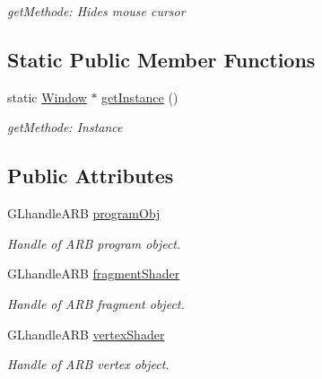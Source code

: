 \begin{DoxyCompactItemize}
\begin{DoxyCompactList}\small\item\em getMethode: Hides mouse cursor \item\end{DoxyCompactList}\end{DoxyCompactItemize}
\subsection*{Static Public Member Functions}
\begin{DoxyCompactItemize}
\item 
\hypertarget{class_f2_c_1_1_window_adc900b123525bb6a454ef0d44b5d65d4}{
static \hyperlink{class_f2_c_1_1_window}{Window} $\ast$ \hyperlink{class_f2_c_1_1_window_adc900b123525bb6a454ef0d44b5d65d4}{getInstance} ()}
\label{class_f2_c_1_1_window_adc900b123525bb6a454ef0d44b5d65d4}

\begin{DoxyCompactList}\small\item\em getMethode: Instance \item\end{DoxyCompactList}\end{DoxyCompactItemize}
\subsection*{Public Attributes}
\begin{DoxyCompactItemize}
\item 
\hypertarget{class_f2_c_1_1_window_a42eeb484184d4baf3bc7fe3c74ecb493}{
GLhandleARB \hyperlink{class_f2_c_1_1_window_a42eeb484184d4baf3bc7fe3c74ecb493}{programObj}}
\label{class_f2_c_1_1_window_a42eeb484184d4baf3bc7fe3c74ecb493}

\begin{DoxyCompactList}\small\item\em Handle of ARB program object. \item\end{DoxyCompactList}\item 
\hypertarget{class_f2_c_1_1_window_af149e31ade5f6fc7385413a83b2176d9}{
GLhandleARB \hyperlink{class_f2_c_1_1_window_af149e31ade5f6fc7385413a83b2176d9}{fragmentShader}}
\label{class_f2_c_1_1_window_af149e31ade5f6fc7385413a83b2176d9}

\begin{DoxyCompactList}\small\item\em Handle of ARB fragment object. \item\end{DoxyCompactList}\item 
\hypertarget{class_f2_c_1_1_window_a6a3ae907d3bc427bb2535d8189e747cf}{
GLhandleARB \hyperlink{class_f2_c_1_1_window_a6a3ae907d3bc427bb2535d8189e747cf}{vertexShader}}
\label{class_f2_c_1_1_window_a6a3ae907d3bc427bb2535d8189e747cf}

\begin{DoxyCompactList}\small\item\em Handle of ARB vertex object. \item\end{DoxyCompactList}\end{DoxyCompactItemize}



